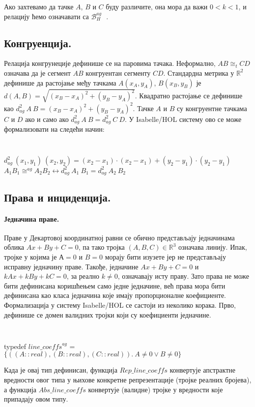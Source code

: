 \documentclass[a4paper, 12pt]{article}
\newcommand{\agbeth}[3]{\ensuremath{\mathcal{B}_H^{\mathit{ag}}\ #1\ #2\ #3}}
\newcommand{\agcongr}[4]{\ensuremath{#1#2 \cong^{ag} #3#4}}
\newcommand{\agsqdist}[2]{\ensuremath{d^2_{ag}\ #1\ #2}}
\newcommand{\congrt}[4]{\ensuremath{#1#2 \cong_t #3#4}}
\begin{document}
\noindent Ако захтевамо да тачке $A$, $B$ и $C$ буду различите, она
мора да важи $0 < k < 1$, и релацију ћемо означавати са
$\agbeth{}{}{}$.

\subsection{Конгруенција.} Релација конгрунеције дефинише се на паровима
тачака. Неформално, $\congrt{A}{B}{C}{D}$ означава да је сегмент $AB$
конгруентан сегменту $CD$. Стандардна метрика у $\mathbb{R}^2$
дефинише да растојање међу тачкама $A(x_A, y_A)$, $B(x_B, y_B)$ је
$d(A, B) = \sqrt{(x_B-x_A)^2+(y_B-y_A)^2}$. Квадратно растојање се
дефинише као $\agsqdist{A}{B} = (x_B-x_A)^2+(y_B-y_A)^2$. Тачке $A$ и
$B$ су конгруентне тачкама $C$ и $D$ ако и само ако $\agsqdist{A}{B} =
\agsqdist{C}{D}$. У Isabelle/HOL систему ово се може формализовати на
следећи начин:

{\tt
\begin{tabbing}
$\agsqdist{(x_1, y_1)}{(x_2, y_2)} = (x_2-x_1)\cdot (x_2-x_1)+(y_2-y_1)\cdot (y_2-y_1)$\\
$\agcongr{A_1}{B_1}{A_2}{B_2} \longleftrightarrow \agsqdist{A_1}{B_1} = \agsqdist{A_2}{B_2}$
\end{tabbing}
}

\subsection{Права и инциденција.}

\paragraph{Једначина праве.}
Праве у Декартовој координатној равни се обично представљају
једначинама облика $Ax + By + C = 0$, па тако тројка $(A, B, C) \in
\mathbb{R}^3$ означава линију. Ипак, тројке у којима је $А = 0$ и $B =
0$ морају бити изузете јер не представљају исправну једначину
праве. Такође, једначине $Ax + By + C = 0$ и $kAx + kBy + kC = 0$, за
реално $k \neq 0$, означавају исту праву. Зато права не може бити
дефинисана коришћењем само једне једначине, већ права мора бити
дефинисана као класа једначина које имају пропорционалне
коефициенте. Формализација у систему Isabelle/HOL се састоји из
неколико корака. Прво, дефинише се домен валидних тројки који су
коефициенти једначине.
{\tt
\begin{tabbing}
typedef $\mathit{line\_coeffs}^{ag}$ = \\
\hspace{5mm}$\{((A::real), (B::real), (C::real)).\ A \neq 0 \vee B \neq 0\}$
\end{tabbing}
}
\noindent Када је овај тип дефинисан, функција
$\mathit{Rep\_line\_coeffs}$ конвертује апстрактне вредности овог типа
у њихове конкретне репрезентације (тројке реалних бројева), а функција
$\mathit{Abs\_line\_coeffs}$ конвертује (валидне) тројке у вредности
које припадају овом типу.
\end{document}
